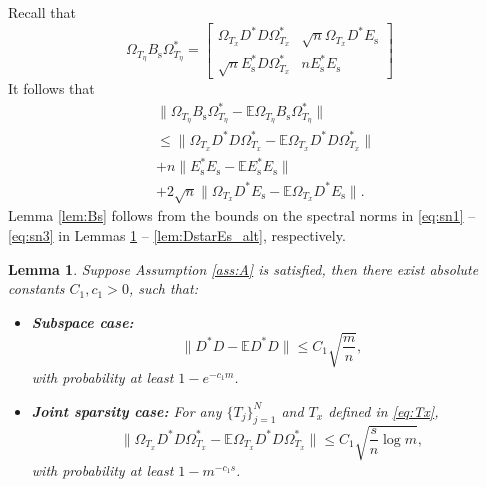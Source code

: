 \documentclass[11pt,journal]{IEEEtran}
\newcommand{\bbE}{\mathbb{E}}
\newcommand{\rms}{\mathrm{s}}
\newcommand{\norm}[1]{\|{#1}\|}
\newtheorem{lemma}[theorem]{Lemma}
\begin{document}
\begin{IEEEproof}
Recall that
\[
\Omega_{T_\eta} B_\rms \Omega_{T_\eta}^* = \begin{bmatrix}
\Omega_{T_x} D^*D \Omega_{T_x}^* & \sqrt{n}\Omega_{T_x}D^*E_\rms \\
\sqrt{n}E_\rms^*D\Omega_{T_x}^* & n E_\rms^*E_\rms
\end{bmatrix}
\]
It follows that
\begin{align}
\nonumber & \norm{\Omega_{T_\eta} B_\rms \Omega_{T_\eta}^* -\bbE \Omega_{T_\eta} B_\rms \Omega_{T_\eta}^*}\\
\label{eq:sn1} & \leq \norm{\Omega_{T_x} D^*D \Omega_{T_x}^* -\bbE \Omega_{T_x} D^*D \Omega_{T_x}^*}\\
\label{eq:sn2} & + n \norm{E_\rms^*E_\rms - \bbE E_\rms^*E_\rms} \\
\label{eq:sn3} & + 2\sqrt{n} \norm{\Omega_{T_x}D^*E_\rms - \bbE \Omega_{T_x}D^*E_\rms}.
\end{align}
Lemma \ref{lem:Bs} follows from the bounds on the spectral norms in \eqref{eq:sn1} -- \eqref{eq:sn3} in Lemmas \ref{lem:DstarD} -- \ref{lem:DstarEs_alt}, respectively.
\end{IEEEproof}



\begin{lemma} \label{lem:DstarD}
Suppose Assumption \ref{ass:A} is satisfied, then there exist absolute constants $C_1, c_1 >0$, such that:
\begin{itemize}
	\item \textbf{Subspace case:}
\[
\norm{D^*D - \bbE D^*D} \leq C_1\sqrt{\frac{m}{n}},
\]
with probability at least $1-e^{-c_1 m}$.

	\item \textbf{Joint sparsity case:} For any $\{T_j\}_{j=1}^N$ and $T_x$ defined in \eqref{eq:Tx}, 
\[
\norm{\Omega_{T_x} D^*D \Omega_{T_x}^* - \bbE \Omega_{T_x} D^*D \Omega_{T_x}^*} \leq C_1\sqrt{\frac{s}{n}\log m},
\]
with probability at least $1-m^{-c_1 s}$.
\end{itemize}

\end{lemma}

\end{document}
